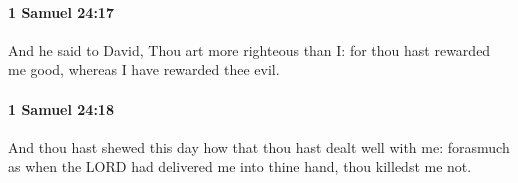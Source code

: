 		\paragraph{1 Samuel 24:17} %
			\label{1SAMUEL-24-17}

			And he said to David, Thou art more righteous than I: for thou hast rewarded me good, whereas I have rewarded thee evil.


		\paragraph{1 Samuel 24:18} %
			\label{1SAMUEL-24-18}

			And thou hast shewed this day how that thou hast dealt well with me: forasmuch as when the LORD had delivered me into thine hand, thou killedst me not.


